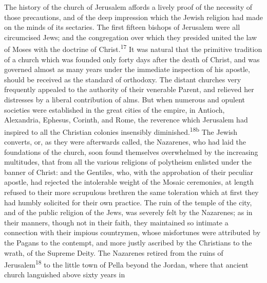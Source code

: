 
The history of the church of Jerusalem affords a lively proof of
the necessity of those precautions, and of the deep impression
which the Jewish religion had made on the minds of its sectaries.
The first fifteen bishops of Jerusalem were all circumcised Jews;
and the congregation over which they presided united the law of
Moses with the doctrine of Christ.\textsuperscript{17} It was natural that the
primitive tradition of a church which was founded only forty days
after the death of Christ, and was governed almost as many years
under the immediate inspection of his apostle, should be received
as the standard of orthodoxy. The distant churches very
frequently appealed to the authority of their venerable Parent,
and relieved her distresses by a liberal contribution of alms.
But when numerous and opulent societies were established in the
great cities of the empire, in Antioch, Alexandria, Ephesus,
Corinth, and Rome, the reverence which Jerusalem had inspired to
all the Christian colonies insensibly diminished.\textsuperscript{18b} The Jewish
converts, or, as they were afterwards called, the Nazarenes, who
had laid the foundations of the church, soon found themselves
overwhelmed by the increasing multitudes, that from all the
various religions of polytheism enlisted under the banner of
Christ: and the Gentiles, who, with the approbation of their
peculiar apostle, had rejected the intolerable weight of the
Mosaic ceremonies, at length refused to their more scrupulous
brethren the same toleration which at first they had humbly
solicited for their own practice. The ruin of the temple of the
city, and of the public religion of the Jews, was severely felt
by the Nazarenes; as in their manners, though not in their faith,
they maintained so intimate a connection with their impious
countrymen, whose misfortunes were attributed by the Pagans to
the contempt, and more justly ascribed by the Christians to the
wrath, of the Supreme Deity. The Nazarenes retired from the ruins
of Jerusalem\textsuperscript{18} to the little town of Pella beyond the Jordan,
where that ancient church languished above sixty years in
